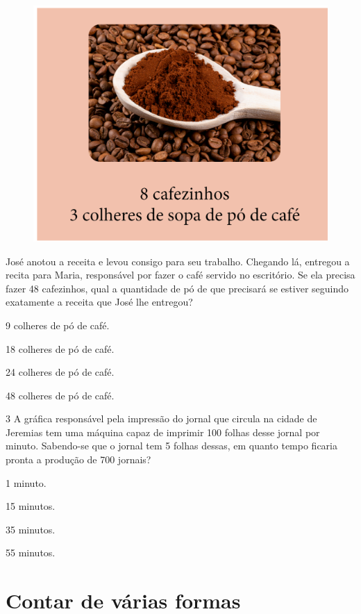 \begin{figure}[htpb!]
\centering
\includegraphics[width=.4\textwidth]{../ilustracoes/MAT5/SAEB_5ANO_MAT_figura80.png}
\end{figure}

José anotou a receita e levou consigo para seu trabalho. Chegando lá,
entregou a recita para Maria, responsável por fazer o café servido no
escritório. Se ela precisa fazer 48 cafezinhos, qual a
quantidade de pó de que precisará se estiver seguindo exatamente a receita que José lhe entregou?

\begin{minipage}{.5\textwidth}
\begin{escolha}
\item
  9 colheres de pó de café.
\item
  18 colheres de pó de café.
\item
  24 colheres de pó de café.
\item
  48 colheres de pó de café.
\end{escolha}
\end{minipage}


\num{3} A gráfica responsável pela impressão do jornal que circula na
cidade de Jeremias tem uma máquina capaz de imprimir 100 folhas desse jornal por minuto. Sabendo-se que o jornal tem 5 folhas dessas, em
quanto tempo ficaria pronta a produção de 700 jornais?

\begin{minipage}{.5\textwidth}
\begin{escolha}
\item
  1 minuto.
\item
  15 minutos.
\item
  35 minutos.
\item
  55 minutos.
\end{escolha}
\end{minipage}


\chapter{Contar de várias formas}

